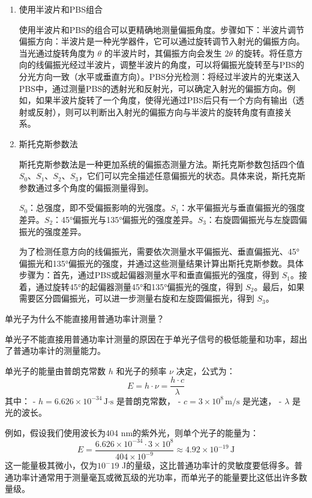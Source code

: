 \begin{enumerate}
	\item 使用半波片和PBS组合
	
	使用半波片和PBS的组合可以更精确地测量偏振角度。步骤如下：半波片调节偏振方向：半波片是一种光学器件，它可以通过旋转调节入射光的偏振方向。当光通过旋转角度为 \( \theta \) 的半波片时，其偏振方向会发生 \( 2\theta \) 的旋转。将任意方向的线偏振光经过半波片，调整半波片的角度，可以将偏振光旋转至与PBS的分光方向一致（水平或垂直方向）。PBS分光检测：将经过半波片的光束送入PBS中，通过测量PBS的透射光和反射光，可以确定入射光的偏振方向。例如，如果半波片旋转了一个角度，使得光通过PBS后只有一个方向有输出（透射或反射），则可以判断出入射光的偏振方向与半波片的旋转角度有直接关系。
	
	\item 斯托克斯参数法
	
	斯托克斯参数法是一种更加系统的偏振态测量方法。斯托克斯参数包括四个值 \( S_0 \)、\( S_1 \)、\( S_2 \)、\( S_3 \)，它们可以完全描述任意偏振光的状态。具体来说，斯托克斯参数通过多个角度的偏振测量得到。
	
	\( S_0 \)：总强度，即不受偏振影响的光强度。\( S_1 \)：水平偏振光与垂直偏振光的强度差异。\( S_2 \)：45°偏振光与135°偏振光的强度差异。\( S_3 \)：右旋圆偏振光与左旋圆偏振光的强度差异。
	
	为了检测任意方向的线偏振光，需要依次测量水平偏振光、垂直偏振光、45°偏振光和135°偏振光的强度，并通过这些测量结果计算出斯托克斯参数。具体步骤为：首先，通过PBS或起偏器测量水平和垂直偏振光的强度，得到 \( S_1 \)。接着，通过旋转45°的起偏器测量45°和135°偏振光的强度，得到 \( S_2 \)。最后，如果需要区分圆偏振光，可以进一步测量右旋和左旋圆偏振光，得到 \( S_3 \)。
\end{enumerate}

\begin{question}
	单光子为什么不能直接用普通功率计测量？
\end{question}
单光子不能直接用普通功率计测量的原因在于单光子信号的极低能量和功率，超出了普通功率计的测量能力。

单光子的能量由普朗克常数 \( h \) 和光子的频率 \( \nu \) 决定，公式为：
\[
E = h \cdot \nu = \frac{h \cdot c}{\lambda}
\]
其中：
- \( h = 6.626 \times 10^{-34} \, \text{J·s} \) 是普朗克常数，
- \( c = 3 \times 10^8 \, \text{m/s} \) 是光速，
- \( \lambda \) 是光的波长。

例如，假设我们使用波长为404 nm的紫外光，则单个光子的能量为：
\[
E = \frac{6.626 \times 10^{-34} \cdot 3 \times 10^8}{404 \times 10^{-9}} \approx 4.92 \times 10^{-19} \, \text{J}
\]
这一能量极其微小，仅为$10^-19$ J的量级，这比普通功率计的灵敏度要低得多。普通功率计通常用于测量毫瓦或微瓦级的光功率，而单光子的能量要比这低出许多数量级。

